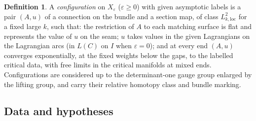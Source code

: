 \documentclass[11pt]{amsart}
\theoremstyle{definition}
\newtheorem{definition}[theorem]{Definition}
\theoremstyle{remark}
\theoremstyle{plain}
\numberwithin{equation}{section}
\newcommand{\eps}{\varepsilon}
\begin{document}
\begin{definition}\label{def:admissible-config}
A \emph{configuration} on $X_\eps$ ($\eps\ge0$) with given
asymptotic labels is a pair $(A,u)$ of a connection on the bundle and a
section map, of class $L^2_{k,\mathrm{loc}}$ for a fixed large $k$, such
that: the restriction of $A$ to each matching surface is flat and
represents the value of $u$ on the seam; $u$ takes values in the given
Lagrangians on the Lagrangian arcs (in $L(C)$ on $I$ when $\eps=0$); and at
every end $(A,u)$ converges exponentially, at the fixed weights below the
gaps, to the labelled critical data, with free limits in the critical
manifolds at mixed ends. Configurations are considered up to the
determinant-one gauge group enlarged by the lifting group, and carry
their relative homotopy class and bundle marking.
\end{definition}

\subsection{Data and hypotheses}\label{subsec:collapse-hypotheses}
\end{document}
